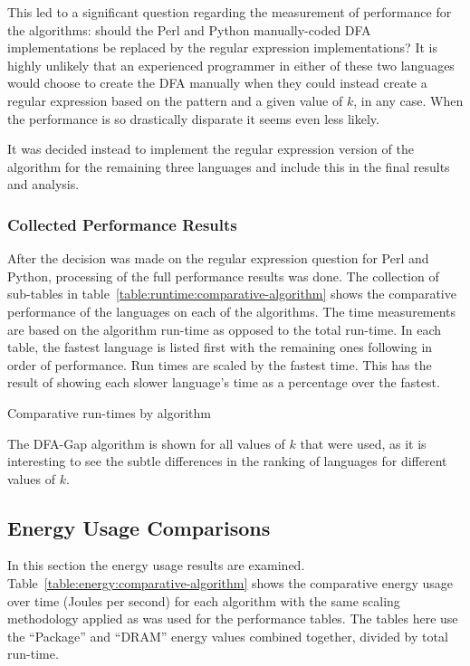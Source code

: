 This led to a significant question regarding the measurement of performance for the algorithms: should the Perl and Python manually-coded DFA implementations be replaced by the regular expression implementations? It is highly unlikely that an experienced programmer in either of these two languages would choose to create the DFA manually when they could instead create a regular expression based on the pattern and a given value of $k$, in any case. When the performance is so drastically disparate it seems even less likely.

It was decided instead to implement the regular expression version of the algorithm for the remaining three languages and include this in the final results and analysis.

\subsubsection{Collected Performance Results}

After the decision was made on the regular expression question for Perl and Python, processing of the full performance results was done. The collection of sub-tables in table~\ref{table:runtime:comparative-algorithm} shows the comparative performance of the languages on each of the algorithms. The time measurements are based on the algorithm run-time as opposed to the total run-time. In each table, the fastest language is listed first with the remaining ones following in order of performance. Run times are scaled by the fastest time. This has the result of showing each slower language's time as a percentage over the fastest.

\begin{table}[!htb]

\caption{Comparative run-times by algorithm}
\label{table:runtime:comparative-algorithm}
\end{table}

The DFA-Gap algorithm is shown for all values of $k$ that were used, as it is interesting to see the subtle differences in the ranking of languages for different values of $k$.

\subsection{Energy Usage Comparisons}
\label{subsec:energy_comp}

In this section the energy usage results are examined. Table~\ref{table:energy:comparative-algorithm} shows the comparative energy usage over time (Joules per second) for each algorithm with the same scaling methodology applied as was used for the performance tables. The tables here use the ``Package'' and ``DRAM'' energy values combined together, divided by total run-time.

